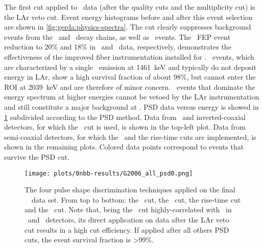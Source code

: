 The first cut applied to \phasetwo\ data (after the quality cuts and the multiplicity cut)
is the LAr veto cut.  Event energy histograms before and after this event selection are
shown in \cref{fig:gerda:physics-spectra}. The cut clearly suppresses background events from
the \Th\ and \Uh\ decay chains, as well as \kvz\ events. The \kvz\ FEP event reduction to
20\% and 18\% in \phasetwo\ and \phasetwop\ data, respectively, demonstrates the
effectiveness of the improved fiber instrumentation installed for \phasetwop. \kvn\
events, which are characterized by a single \g\ emission at 1461~keV and typically do not
deposit energy in LAr, show a high survival fraction of about 98\%, but cannot enter the
ROI at 2039~keV and are therefore of minor concern. \a\ events that dominate the energy
spectrum at higher energies cannot be vetoed by the LAr instrumentation and still
constitute a major background at \qbb.
\newpar
PSD data versus energy is showed in \cref{fig:gerda:psd-on-data} subdivided according to
the PSD method. Data from \bege\ and inverted-coaxial detectors, for which the \aoe\ cut
is used, is shown in the top-left plot. Data from semi-coaxial detectors, for which the
\annmse\ and the rise-time cuts are implemented, is shown in the remaining plots. Colored
data points correspond to events that survive the PSD cut.

\begin{figure}
  \centering
  \texttt{[image: plots/0nbb-results/G2006\_all\_psd0.png]}%
  \caption{%
    The four pulse shape discrimination techniques applied on the final \gerda\ \phasetwo\
    data set. From top to bottom: the \aoe\ cut, the \annmse\ cut, the
    rise-time cut and the \deltae\ cut. Note that, being the \deltae\ cut
    highly-correlated with \aoe\ in \bege\ and \icoax\ detectors, its direct application
    on data after the LAr veto cut results in a high cut efficiency. If applied after all
    others PSD cuts, the event survival fraction is >99\%.
  }\label{fig:gerda:psd-on-data}
\end{figure}

